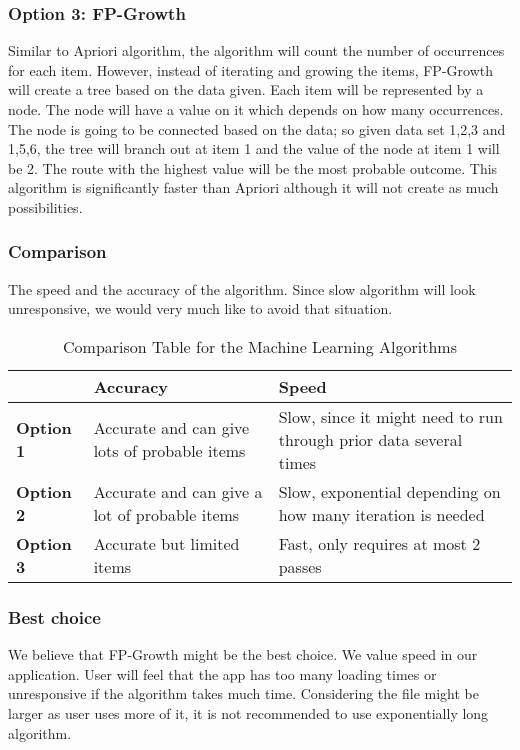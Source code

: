 \documentclass[journal,compsoc, 10pt, draftclsnofoot, onecolumn]{IEEEtran}
\begin{document}
\subsubsection*{Option 3: FP-Growth}
Similar to Apriori algorithm, the algorithm will count the number of occurrences for
each item. However, instead of iterating and growing the items, FP-Growth will create
a tree based on the data given. Each item will be represented by a node. The node
will have a value on it which depends on how many occurrences. The node is going to
be connected based on the data; so given data set {1,2,3} and {1,5,6}, the tree will
branch out at item 1 and the value of the node at item 1 will be 2. The route with
the highest value will be the most probable outcome. This algorithm is significantly
faster than Apriori although it will not create as much possibilities.

\subsubsection{Comparison}
The speed and the accuracy of the algorithm. Since slow algorithm will look
unresponsive, we would very much like to avoid that situation.

\begin{table}[h]
	\centering
	\caption{Comparison Table for the Machine Learning Algorithms}
	\label{Comparison Table for the Machine Learning Algorithms}
	\begin{tabularx}{\textwidth}{|X|X|X|}
		\hline
		\textbf{}         & \textbf{Accuracy}                & \textbf{Speed} 
		\\ \hline
\textbf{Option 1} & Accurate and can give lots of probable items & Slow, since it
might need to run through prior data several times
		\\ \hline
\textbf{Option 2} & Accurate and can give a lot of probable items & Slow, exponential
depending on how many iteration is needed
		\\ \hline
\textbf{Option 3} & Accurate but limited items & Fast, only requires at most 2 passes		\\ \hline
	\end{tabularx}
\end{table}

\subsubsection{Best choice}
We believe that FP-Growth might be the best choice. We value speed in our
application. User will feel that the app has too many loading times or unresponsive
if the algorithm takes much time. Considering the file might be larger as user uses
more of it, it is not recommended to use exponentially long algorithm.
\end{document}
